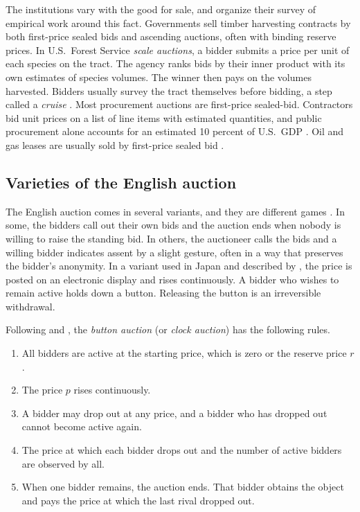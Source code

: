 The institutions vary with the good for sale, and \citet{HortacsuPerrigne2021} organize their survey of
empirical work around this fact. Governments sell timber harvesting contracts by both first-price
sealed bids and ascending auctions, often with binding reserve prices. In U.S.\ Forest Service
\emph{scale auctions}, a bidder submits a price per unit of each species on the tract. The agency ranks
bids by their inner product with its own estimates of species volumes. The winner then pays on the
volumes harvested. Bidders usually survey the tract themselves before bidding, a step called a
\emph{cruise} \citep[Section~2, p.~86]{HortacsuPerrigne2021}. Most procurement auctions are first-price
sealed-bid. Contractors bid unit prices on a list of line items with estimated quantities, and public
procurement alone accounts for an estimated 10 percent of U.S.\ GDP \citep[Section~3,
p.~101]{HortacsuPerrigne2021}. Oil and gas leases are usually sold by first-price sealed bid
\citep[Section~4, p.~124]{HortacsuPerrigne2021}.

\subsection{Varieties of the English auction}\label{sec:14-formats-english}

The English auction comes in several variants, and they are different games
\citep[pp.~1103--1104]{MilgromWeber1982}. In some, the bidders call out their own bids and the auction
ends when nobody is willing to raise the standing bid. In others, the auctioneer calls the bids and a
willing bidder indicates assent by a slight gesture, often in a way that preserves the bidder's anonymity.
In a variant used in Japan and described by \citet{Cassady1967}, the price is posted on an electronic
display and rises continuously. A bidder who wishes to remain active holds down a button. Releasing the
button is an irreversible withdrawal.

\begin{definition}\label{def:14-button}
Following \citet[p.~1104]{MilgromWeber1982} and \citet[Section~2.2.2]{AtheyHaile2007}, the \emph{button
auction} (or \emph{clock auction}) has the following rules.
\begin{enumerate}[label=(\roman*)]
  \item All bidders are active at the starting price, which is zero or the reserve price $r$.
  \item The price $p$ rises continuously.
  \item A bidder may drop out at any price, and a bidder who has dropped out cannot become active again.
  \item The price at which each bidder drops out and the number of active bidders are observed by all.
  \item When one bidder remains, the auction ends. That bidder obtains the object and pays the price at
  which the last rival dropped out.
\end{enumerate}
\end{definition}

